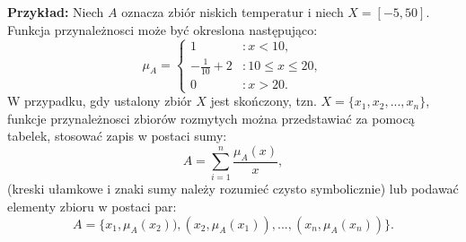 \documentclass[a4paper,12pt]{article}
\theoremstyle{definition}
\begin{document}
\medskip
\noindent
{\bf Przykład:} Niech $A$ oznacza zbiór niskich temperatur i niech $X = [-5,50]$. Funkcja przynależnosci może być okreslona następująco:
\begin{equation} \label{eq3}
\mu_A = \left\lbrace
\begin{array}{ll}
1  &:x < 10, \\
-\frac{1}{10} + 2 & :10 \leqslant x \leqslant 20, \\
0 &:x > 20.
\end{array}\right.
\end{equation}
W przypadku, gdy ustalony zbiór $X$ jest skończony, tzn. $X = \{x_1,x_2,...,x_n\}$, funkcje przynależnosci zbiorów rozmytych można przedstawiać za pomocą tabelek, stosować zapis w postaci sumy:
\begin{equation} \label{eq4}
A = \sum_{i=1}^n\frac{\mu_A(x)}{x},
\end{equation}
(kreski ułamkowe i znaki sumy należy rozumieć czysto symbolicznie) lub podawać elementy zbioru w postaci par:
\begin{equation} \label{eq5}
 A = \{x_1,\mu_A(x_2)),(x_2,\mu_A(x_1)),...,(x_n,\mu_A(x_n))\}.
\end{equation}
\end{document}
